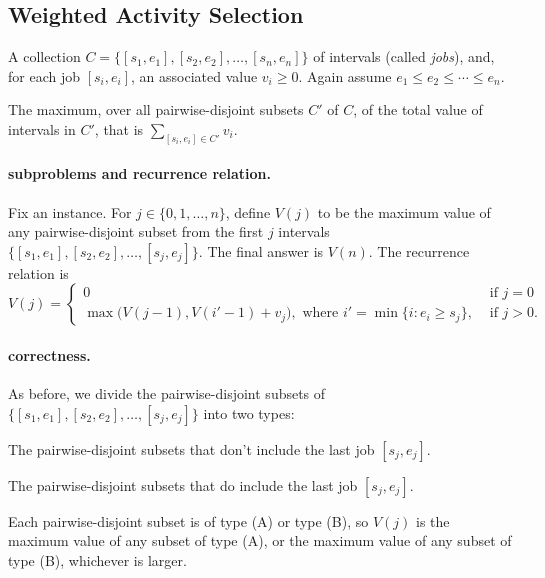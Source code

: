 \subsection*{Weighted Activity Selection}

\begin{mylist}
\item[\bf input:]
  A collection $C=\{[s_1, e_1], [s_2, e_2], \ldots, [s_n, e_n]\}$ of intervals (called \emph{jobs}),
  and, for each job $[s_i, e_i]$, an associated value $v_i \ge 0$.
  Again assume $e_1 \le e_2 \le \cdots \le e_n$.

\item[\bf output:]
  The maximum, over all pairwise-disjoint subsets $C'$ of $C$,
  of the total value of intervals in $C'$, that is $\sum_{[s_i, e_i]\in C'} v_i$.
\end{mylist}

\paragraph{subproblems and recurrence relation.} 
Fix an instance.
For $j\in\{0,1,\ldots,n\}$,
define $V(j)$ to be the maximum value of any pairwise-disjoint subset from
the first $j$ intervals
$\{[s_1, e_1], [s_2, e_2], \ldots, [s_j, e_j]\}$.
The final answer is $V(n)$.
The recurrence relation is
\[
  V(j) = \begin{cases}
    0 & \text{ if } j=0 \\
    \max\big( V(j-1), V(i'-1) + v_j\big), \text{ where }  i' = \min\{ i : e_i \ge s_j \},
    & \text{ if } j>0.
  \end{cases} 
\]

\paragraph{correctness.}
As before, we divide the pairwise-disjoint subsets of $\{[s_1, e_1], [s_2, e_2], \ldots, [s_j, e_j]\}$ into two types:
\begin{mylist}
\item[(A)] The pairwise-disjoint subsets that don't include the last job $[s_j, e_j]$. 
\item[(B)] The pairwise-disjoint subsets that do include the last job $[s_j, e_j]$. 
\end{mylist}
Each pairwise-disjoint subset is of type (A) or type (B),
so $V(j)$
is the maximum value of any subset of type (A),
or the maximum value of any subset of type (B),
whichever is larger.

